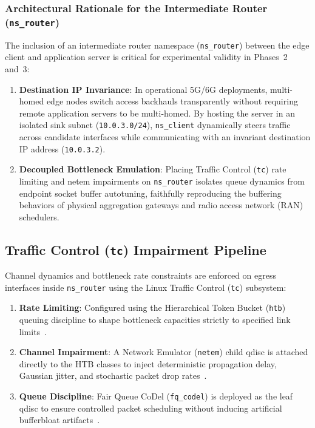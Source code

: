 \documentclass[conference]{IEEEtran}
\begin{document}
\subsubsection{Architectural Rationale for the Intermediate Router (\texttt{ns\_router})}
The inclusion of an intermediate router namespace (\texttt{ns\_router}) between the edge client and application server is critical for experimental validity in Phases~2 and~3:
\begin{enumerate}
    \item \textbf{Destination IP Invariance}: In operational 5G/6G deployments, multi-homed edge nodes switch access backhauls transparently without requiring remote application servers to be multi-homed. By hosting the server in an isolated sink subnet (\texttt{10.0.3.0/24}), \texttt{ns\_client} dynamically steers traffic across candidate interfaces while communicating with an invariant destination IP address (\texttt{10.0.3.2}).
    \item \textbf{Decoupled Bottleneck Emulation}: Placing Traffic Control (\texttt{tc}) rate limiting and netem impairments on \texttt{ns\_router} isolates queue dynamics from endpoint socket buffer autotuning, faithfully reproducing the buffering behaviors of physical aggregation gateways and radio access network (RAN) schedulers.
\end{enumerate}

\subsection{Traffic Control (\texttt{tc}) Impairment Pipeline}
Channel dynamics and bottleneck rate constraints are enforced on egress interfaces inside \texttt{ns\_router} using the Linux Traffic Control (\texttt{tc}) subsystem:
\begin{enumerate}
    \item \textbf{Rate Limiting}: Configured using the Hierarchical Token Bucket (\texttt{htb}) queuing discipline to shape bottleneck capacities strictly to specified link limits~\cite{devera2002htb}.
    \item \textbf{Channel Impairment}: A Network Emulator (\texttt{netem}) child qdisc is attached directly to the HTB classes to inject deterministic propagation delay, Gaussian jitter, and stochastic packet drop rates~\cite{hemminger2005netem}.
    \item \textbf{Queue Discipline}: Fair Queue CoDel (\texttt{fq\_codel}) is deployed as the leaf qdisc to ensure controlled packet scheduling without inducing artificial bufferbloat artifacts~\cite{rfc8290_fqcodel, nichols2012codel}.
\end{enumerate}
\end{document}
